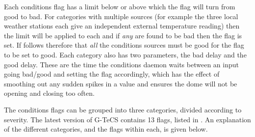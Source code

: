 \begin{colsection}
\begin{colsection}
Each conditions flag has a limit below or above which the flag will turn from good to bad. For categories with multiple sources (for example the three local weather stations each give an independent external temperature reading) then the limit will be applied to each and if \textit{any} are found to be bad then the flag is set. If follows therefore that \textit{all} the conditions sources must be good for the flag to be set to good. Each category also has two parameters, the bad delay and the good delay. These are the time the conditions daemon waits between an input going bad/good and setting the flag accordingly, which has the effect of smoothing out any sudden spikes in a value and ensures the dome will not be opening and closing too often.

The conditions flags can be grouped into three categories, divided according to severity. The latest version of G-TeCS contains 13 flags, listed in . An explanation of the different categories, and the flags within each, is given below.


\end{colsection}
\end{colsection}
